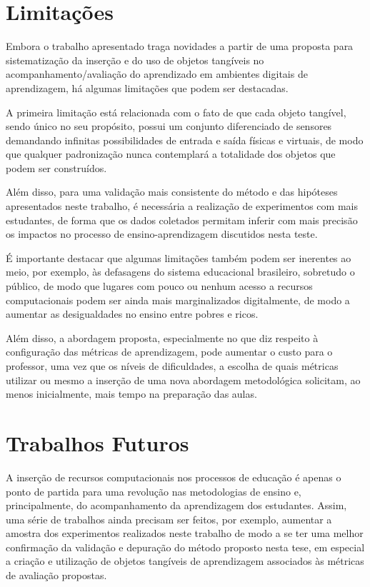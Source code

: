 \section{Limitações}

Embora o trabalho apresentado traga novidades a partir de uma proposta para sistematização da inserção e do uso de objetos tangíveis no acompanhamento/avaliação do aprendizado em ambientes digitais de aprendizagem, há algumas limitações que podem ser destacadas.

A primeira limitação está relacionada com o fato de que cada objeto tangível, sendo único no seu propósito, possui um conjunto diferenciado de sensores demandando infinitas possibilidades de entrada e saída físicas e virtuais, de modo que qualquer padronização nunca contemplará a totalidade dos objetos que podem ser construídos.

Além disso, para uma validação mais consistente do método e das hipóteses apresentados neste trabalho, é necessária a realização de experimentos com mais estudantes, de forma que os dados coletados permitam inferir com mais precisão os impactos no processo de ensino-aprendizagem discutidos nesta teste.

É importante destacar que algumas limitações também podem ser inerentes ao meio, por exemplo, às defasagens do sistema educacional brasileiro, sobretudo o público, de modo que lugares com pouco ou nenhum acesso a recursos computacionais podem ser ainda mais marginalizados digitalmente, de modo a aumentar as desigualdades no ensino entre pobres e ricos. 

Além disso, a abordagem proposta, especialmente no que diz respeito à configuração das métricas de aprendizagem, pode aumentar o custo para o professor, uma vez que os níveis de dificuldades, a escolha de quais métricas utilizar ou mesmo a inserção de uma nova abordagem metodológica solicitam, ao menos inicialmente, mais tempo na preparação das aulas.


\section{Trabalhos Futuros}

A inserção de recursos computacionais nos processos de educação é apenas o ponto de partida para uma revolução nas metodologias de ensino e, principalmente, do acompanhamento da aprendizagem dos estudantes. Assim, uma série de trabalhos ainda precisam ser feitos, por exemplo, aumentar a amostra dos experimentos realizados neste trabalho de modo a se ter uma melhor confirmação da validação e depuração do método proposto nesta tese, em especial a criação e utilização de objetos tangíveis de aprendizagem associados às métricas de avaliação propostas.

